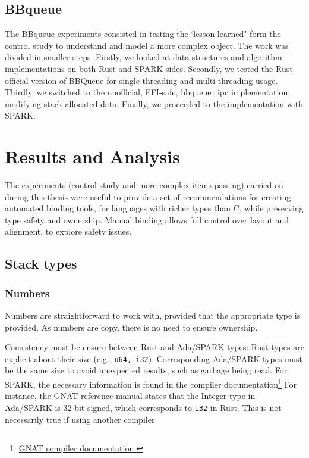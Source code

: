 \documentclass[nomenclature, english, bibtex]{kththesis}
\begin{document}
\section{BBqueue}

The BBqueue experiments consisted in testing the `lesson learned" form the control study to understand and model a more complex object. The work was divided in smaller steps. Firstly, we looked at data structures and algorithm implementations on both Rust and SPARK sides. Secondly, we tested the Rust official version of BBQueue for single-threading and multi-threading usage. Thirdly, we switched to the unofficial, FFI-safe, bbqueue\_ipc implementation, modifying stack-allocated data. 
Finally, we proceeded to the  implementation with SPARK.

\cleardoublepage
\chapter{Results and Analysis}
\label{ch:resultsAndAnalysis}

The experiments (control study and more complex items passing) carried on during this thesis were useful to provide a set of recommendations for creating automated binding tools, for languages with richer types than C, while preserving type safety and ownership. Manual binding allows full control over layout and alignment, to explore safety issues.


\section{Stack types}
\subsection{Numbers}
\label{sec:numbers}
Numbers are straightforward to work with, provided that the appropriate type is provided. As numbers are copy, there is no need to ensure ownership. 

Consistency must be ensure between Rust and Ada/SPARK types: Rust types are explicit about their size (e.g., \texttt{u64, i32}). Corresponding Ada/SPARK types must be the same size to avoid unexpected results, such as garbage being read. For SPARK, the necessary information is found in the compiler documentation\footnote{\href{https://docs.adacore.com/gnat_rm-docs/html/gnat_rm/gnat_rm/implementation_defined_characteristics.html}{GNAT compiler documentation.}}
For instance, the GNAT reference manual states that the Integer type in Ada/SPARK is 32-bit signed, which corresponds to \texttt{i32} in Rust. This is not necessarily true if using another compiler.
\end{document}
